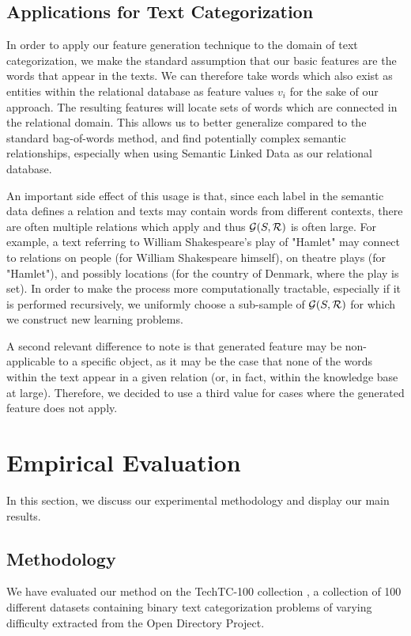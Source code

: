 \documentclass{article}
\theoremstyle{definition}
\begin{document}
\subsection{Applications for Text Categorization}
In order to apply our feature generation technique to the domain of text categorization, we make the standard assumption that our basic features are the words that appear in the texts. We can therefore take words which also exist as entities within the relational database as feature values $v_i$ for the sake of our approach.
The resulting features will locate sets of words which are connected in the relational domain. This allows us to better generalize compared to the standard bag-of-words method, and find potentially complex semantic relationships, especially when using Semantic Linked Data as our relational database.

An important side effect of this usage is that, since each label in the semantic data defines a relation and texts may contain words from different contexts, there are often multiple relations which apply and thus ${\cal G}(S,{\cal R})$ is often large. For example, a text referring to William Shakespeare's play of "Hamlet" may connect to relations on people (for William Shakespeare himself), on theatre plays (for "Hamlet"), and possibly locations (for the country of Denmark, where the play is set).
In order to make the process more computationally tractable, especially if it is performed recursively, we uniformly choose a sub-sample of ${\cal G}(S,{\cal R})$ for which we construct new learning problems.

A second relevant difference to note is that generated feature may be non-applicable to a specific object, as it may be the case that none of the words within the text appear in a given relation (or, in fact, within the knowledge base at large). Therefore, we decided to use a third value for cases where the generated feature does not apply.

\section{Empirical Evaluation}
In this section, we discuss our experimental methodology and display our main results.
\subsection{Methodology}
We have evaluated our method on the TechTC-100 collection \citep{gabrilovich2004text}, a collection of 100 different datasets containing binary text categorization problems of varying difficulty extracted from the Open Directory Project.
\end{document}
